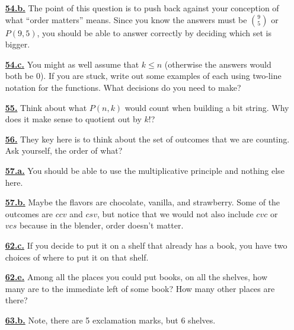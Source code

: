\documentclass[10pt,]{book}
\theoremstyle{plain}
\theoremstyle{definition}
\theoremstyle{definition}
\theoremstyle{definition}
\numberwithin{equation}{chapter}
\begin{document}
\begin{itemize}[itemsep=1em]
\hypertarget{a-54.b}{}\item[\textbf{\hyperref[task-79]{54.b.}}]
\hypertarget{p-355}{}%
The point of this question is to push back against your conception of what ``order matters'' means.  Since you know the answers must be \(\binom{9}{5}\) or \(P(9,5)\), you should be able to answer correctly by deciding which set is bigger.%

\hypertarget{a-54.c}{}\item[\textbf{\hyperref[task-80]{54.c.}}]
\hypertarget{p-357}{}%
You might as well assume that \(k \le n\) (otherwise the answers would both be 0).  If you are stuck, write out some examples of each using two-line notation for the functions.  What decisions do you need to make?%

\hypertarget{a-55}{}\item[\textbf{\hyperref[activity-55]{55.}}]
\hypertarget{p-359}{}%
Think about what \(P(n,k)\) would count when building a bit string.  Why does it make sense to quotient out by \(k!\)?%

\hypertarget{a-56}{}\item[\textbf{\hyperref[activity-56]{56.}}]
\hypertarget{p-361}{}%
They key here is to think about the set of outcomes that we are counting.  Ask yourself, the order of what?%

\hypertarget{a-57.a}{}\item[\textbf{\hyperref[task-81]{57.a.}}]
\hypertarget{p-365}{}%
You should be able to use the multiplicative principle and nothing else here.%

\hypertarget{a-57.b}{}\item[\textbf{\hyperref[task-82]{57.b.}}]
\hypertarget{p-367}{}%
Maybe the flavors are chocolate, vanilla, and strawberry.  Some of the outcomes are \(ccv\) and \(csv\), but notice that we would not also include \(cvc\) or \(vcs\) because in the blender, order doesn't matter.%

\hypertarget{a-62.c}{}\item[\textbf{\hyperref[task-94]{62.c.}}]
\hypertarget{p-394}{}%
If you decide to put it on a shelf that already has a book, you have two choices of where to put it on that shelf.%

\hypertarget{a-62.e}{}\item[\textbf{\hyperref[task-96]{62.e.}}]
\hypertarget{p-399}{}%
Among all the places you could put books, on all the shelves, how many are to the immediate left of some book? How many other places are there?%

\hypertarget{a-63.b}{}\item[\textbf{\hyperref[task-99]{63.b.}}]
\hypertarget{p-410}{}%
Note, there are 5 exclamation marks, but 6 shelves.%


\end{itemize}
\end{document}

